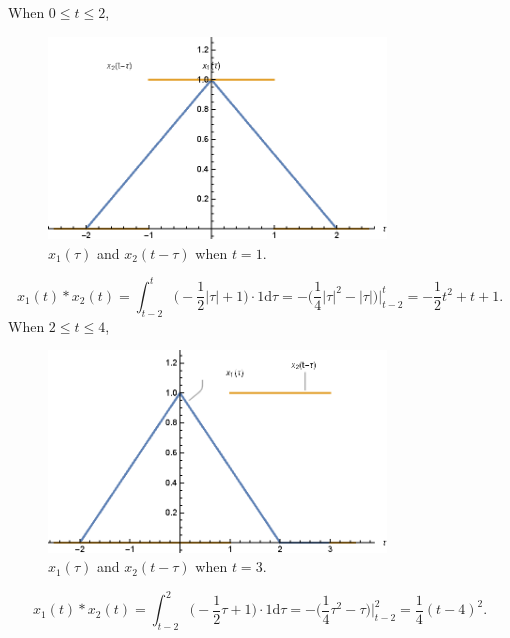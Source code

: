 \documentclass[a4paper]{article}
\begin{document}
When $0\leq t\leq2$,
\begin{figure}[H]
    \begin{center}
        \includegraphics[width=0.8\textwidth]{12-6.eps}
    \end{center}
    \caption{$x_1(\tau)$ and $x_2(t-\tau)$ when $t=1$.}
\end{figure}
$$x_1(t)*x_2(t)=\int_{t-2}^t\bigg(-\frac{1}{2}|\tau|+1\bigg)\cdot1\mathrm{d}\tau=-\bigg(\frac{1}{4}|\tau|^2-|\tau|\bigg)\bigg|_{t-2}^t=-\frac{1}{2}t^2+t+1.$$
\newpage
When $2\leq t\leq4$,
\begin{figure}[H]
    \begin{center}
        \includegraphics[width=0.8\textwidth]{12-7.eps}
    \end{center}
    \caption{$x_1(\tau)$ and $x_2(t-\tau)$ when $t=3$.}
\end{figure}
$$x_1(t)*x_2(t)=\int_{t-2}^2\bigg(-\frac{1}{2}\tau+1\bigg)\cdot1\mathrm{d}\tau=-\bigg(\frac{1}{4}\tau^2-\tau\bigg)\bigg|_{t-2}^2=\frac{1}{4}(t-4)^2.$$
\end{document}
